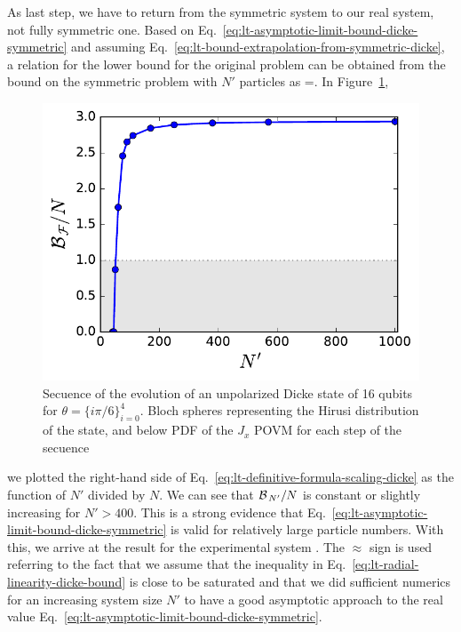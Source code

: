 As last step, we have to return from the symmetric system to our real system, not fully symmetric one.
Based on Eq.~\eqref{eq:lt-asymptotic-limit-bound-dicke-symmetric} and assuming Eq.~\eqref{eq:lt-bound-extrapolation-from-symmetric-dicke}, a relation for the lower bound for the original problem can be obtained from the bound on the symmetric problem with $N'$ particles as
\be
  \label{eq:lt-definitive-formula-scaling-dicke}
  \approx {}  =.
\ee
In Figure~\ref{fig:assimpthotic-approach-to-the-bound-from-scaled-dicke},
\begin{figure}[htp]
  \centering
  \includegraphics[scale=.65]{img/plots/LT_dicke_7900_asymp.pdf}
  \caption[Asymptotic behaviour of the bound for increasing size systems for Dicke like experimental data]{Secuence of the evolution of an unpolarized Dicke state of 16 qubits for $\theta=\{i\pi/6\}_{i=0}^4$. Bloch spheres representing the Hirusi distribution of the state, and below PDF of the $J_x$ POVM for each step of the secuence}
  \label{fig:assimpthotic-approach-to-the-bound-from-scaled-dicke}
\end{figure}
we plotted the right-hand side of Eq.~\eqref{eq:lt-definitive-formula-scaling-dicke} as the function of $N'$ divided by $N$.
We can see that $\mathcal{B}_{\, N' }/N$ is constant or slightly increasing for $N'>400$.
This is a strong evidence that Eq.~\eqref{eq:lt-asymptotic-limit-bound-dicke-symmetric} is valid for relatively large particle numbers.
With this, we arrive at the result for the experimental system
\be
  \label{eq:lt-result-experimental-dicke}
  .
\ee
The $\approx$ sign is used referring to the fact that we assume that the inequality in Eq.~\eqref{eq:lt-radial-linearity-dicke-bound} is close to be saturated and that we did sufficient numerics for an increasing system size $N'$ to have a good asymptotic approach to the real value Eq.~\eqref{eq:lt-asymptotic-limit-bound-dicke-symmetric}.

